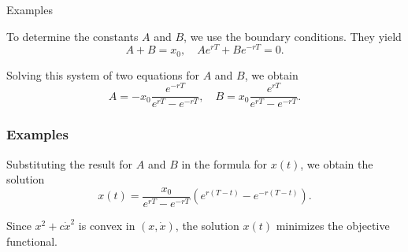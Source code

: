 \documentclass[10pt]{beamer}
\theoremstyle{definition}
\begin{document}
\begin{section}{Examples}
\begin{frame}[fragile]
\begin{example}[cont.]
To determine the constants $ A $ and $ B $, we use the boundary conditions. They yield \[ A + B = x_0, \quad A e^{rT}+B e^{-rT} = 0. \]

Solving this system of two equations for $ A $ and $ B $, we obtain \[ A = -x_0 \dfrac{e^{-rT}}{e^{rT}-e^{-rT}},\quad B = x_0 \dfrac{e^{rT}}{e^{rT}-e^{-rT}}. \] 
\end{example}
\end{frame}

\begin{frame}[fragile]
\frametitle{Examples}\addtocounter{theorem}{-1}
\begin{example}[cont.]
Substituting the result for $ A $ and $ B $ in the formula for $ x(t) $, we obtain the solution \[ x(t) = \dfrac{x_0}{e^{rT}-e^{-rT}}\left( e^{r(T-t)}-e^{-r(T-t)}\right). \]\bigskip

Since $ x^2 + c \dot{x}^2 $ is convex in $ (x,\dot{x}) $, the solution $ x(t) $ minimizes the objective functional.
\end{example}
\end{frame}

%


\end{section}
\end{document}
